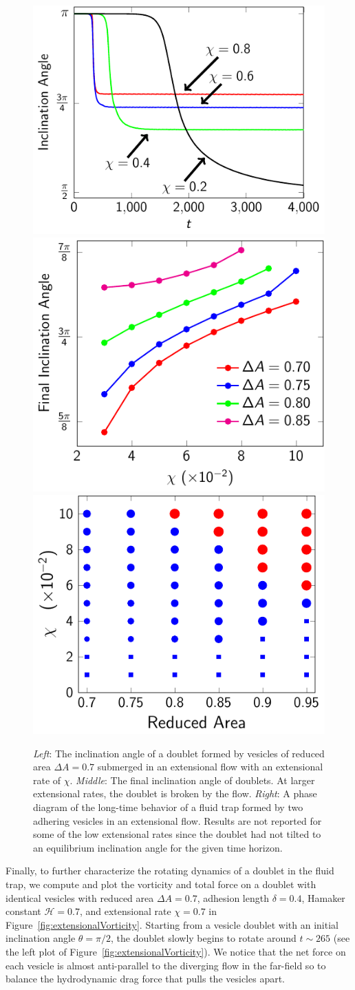 \documentclass[prf,superscriptaddress,showpacs]{revtex4-1}
\begin{document}
\begin{figure}[htp]
  \includegraphics[height=0.27\textwidth]{figs/adR4em1adS7em1_ra070_inclinationAngle.pdf}
  \includegraphics[height=0.27\textwidth]{figs/adR4em1adS7em1_finalInclinationAngle.pdf}
  \includegraphics[height=0.27\textwidth]{figs/extensional_adR4em1adS7em1_phaseDiagram.pdf}
  \caption{\label{fig:extensionalInclinationAngle} {\em Left}: The
  inclination angle of a doublet formed by vesicles of reduced area
  $\Delta A = 0.7$ submerged in an extensional flow with an extensional
  rate of $\chi$.  {\em Middle}: The final inclination angle of doublets.
  At larger extensional rates, the doublet is broken by the flow.
  {\em Right}: A phase diagram of the long-time
  behavior of a fluid trap formed by two adhering vesicles in an
  extensional flow.
  Results are not reported for some of the low extensional rates since
  the doublet had not tilted to an equilibrium inclination angle for the
  given time horizon.}
\end{figure}

Finally, to further characterize the rotating dynamics of a doublet in the fluid trap, we
compute and plot the vorticity and total force on a doublet with identical vesicles
with reduced area $\Delta A=0.7$, adhesion length $\delta = 0.4$, Hamaker constant $\mathcal{H} = 0.7$, and
extensional rate $\chi = 0.7$ in Figure~\ref{fig:extensionalVorticity}.
Starting from a vesicle doublet with an initial inclination angle $\theta=\pi/2$, 
the doublet slowly begins to rotate around $t\sim 265$
(see the left plot of
Figure~\ref{fig:extensionalVorticity}).  We notice that the net force on each vesicle is almost 
anti-parallel to the diverging flow in the
far-field so to balance the hydrodynamic drag force that pulls the vesicles apart. 
\end{document}
